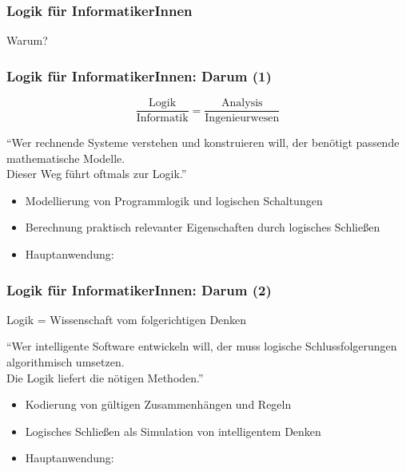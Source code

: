 \documentclass[aspectratio=1610,onlymath]{beamer}
\begin{document}


\begin{frame}\frametitle{Logik für InformatikerInnen}

\pause
\begin{center}
\Huge Warum?
\end{center}

\end{frame}

\begin{frame}\frametitle{Logik für InformatikerInnen: Darum (1)}

\begin{center}
\LARGE 
\[ \frac{\text{Logik}}{\text{Informatik}} = \frac{\text{Analysis}}{\text{Ingenieurwesen}}\]

\bigskip
\large
"`Wer rechnende Systeme verstehen und konstruieren will, der benötigt passende mathematische Modelle.\\Dieser Weg führt oftmals zur Logik."'
\end{center}


\begin{itemize}
\item Modellierung von Programm\alert{logik} und \alert{logischen} Schaltungen
\item Berechnung praktisch relevanter Eigenschaften durch logisches Schließen
\item Hauptanwendung: 
\end{itemize}

\end{frame}

\begin{frame}\frametitle{Logik für InformatikerInnen: Darum (2)}

\begin{center}
\LARGE 
Logik = Wissenschaft vom folgerichtigen Denken

\bigskip
\large
"`Wer intelligente Software entwickeln will, der muss logische Schlussfolgerungen algorithmisch umsetzen.\\
Die Logik liefert die nötigen Methoden."'
\end{center}


\begin{itemize}
\item Kodierung von gültigen Zusammenhängen und Regeln
\item Logisches Schließen als Simulation von intelligentem Denken
\item Hauptanwendung: 
\end{itemize}

\end{frame}
\end{document}
